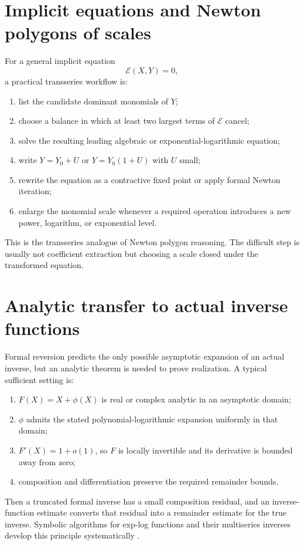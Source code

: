 \documentclass[11pt,oneside,openany]{book}
\begin{document}
\section{Implicit equations and Newton polygons of scales}
For a general implicit equation
\begin{equation}\label{eq:impliciteq}
 \mathcal{E}(X,Y)=0,
\end{equation}
a practical transseries workflow is:
\begin{enumerate}
\item list the candidate dominant monomials of \(Y\);
\item choose a balance in which at least two largest terms of
\(\mathcal{E}\) cancel;
\item solve the resulting leading algebraic or exponential-logarithmic
equation;
\item write \(Y=Y_0+U\) or \(Y=Y_0(1+U)\) with \(U\) small;
\item rewrite the equation as a contractive fixed point or apply formal
Newton iteration;
\item enlarge the monomial scale whenever a required operation introduces a
new power, logarithm, or exponential level.
\end{enumerate}
This is the transseries analogue of Newton polygon reasoning.  The difficult
step is usually not coefficient extraction but choosing a scale closed under
the transformed equation.

\section{Analytic transfer to actual inverse functions}
Formal reversion predicts the only possible asymptotic expansion of an actual
inverse, but an analytic theorem is needed to prove realization.  A typical
sufficient setting is:
\begin{enumerate}
\item \(F(X)=X+\phi(X)\) is real or complex analytic in an asymptotic domain;
\item \(\phi\) admits the stated polynomial-logarithmic expansion uniformly in
that domain;
\item \(F'(X)=1+o(1)\), so \(F\) is locally invertible and its derivative is
bounded away from zero;
\item composition and differentiation preserve the required remainder
bounds.
\end{enumerate}
Then a truncated formal inverse has a small composition residual, and an
inverse-function estimate converts that residual into a remainder estimate for
the true inverse.  Symbolic algorithms for exp-log functions and their
multiseries inverses develop this principle systematically
\cite{SalvyShackell1999,SalvyShackell1998}.
\end{document}

